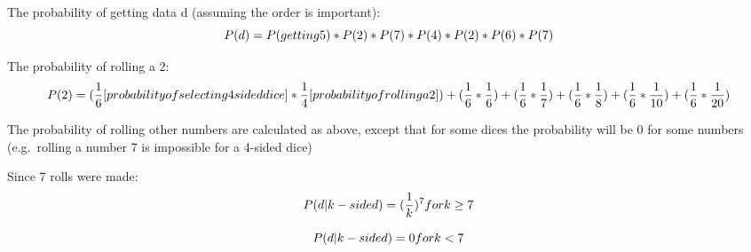 \documentclass[11pt]{article}
\def\lt{<}
\begin{document}
    The probability of getting data d (assuming the order is important):
\[P(d) = P(getting\space5)*P(2)*P(7)*P(4)*P(2)*P(6)*P(7)\]

    The probability of rolling a 2:
\[P(2) = (\frac{1}{6}[probability \space of \space selecting \space 4sided \space dice] * \frac{1}{4}[probability \space of \space rolling \space a \space 2]) + (\frac{1}{6} * \frac{1}{6}) + (\frac{1}{6} * \frac{1}{7}) + (\frac{1}{6} * \frac{1}{8}) + (\frac{1}{6} * \frac{1}{10}) + (\frac{1}{6} * \frac{1}{20})\]

The probability of rolling other numbers are calculated as above, except
that for some dices the probability will be 0 for some numbers
(e.g.~rolling a number 7 is impossible for a 4-sided dice)

    Since 7 rolls were made:
\[P(d | k-sided) = (\frac{1}{k})^7 \space for \space k\ge 7\]

    \[P(d | k-sided) = 0 \space for \space k\lt 7\]


    
    
    
    
\end{document}
